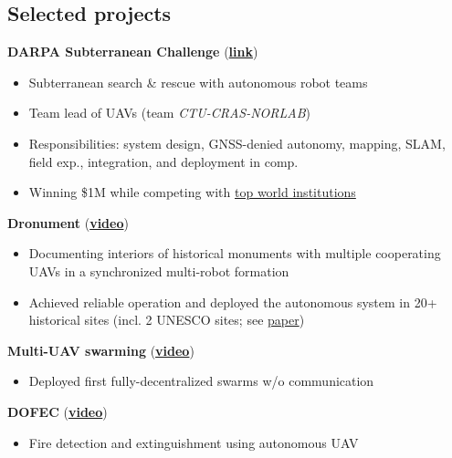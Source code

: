 \documentclass[12pt,a4paper]{article}
\newcommand\Colorhreff[3][reff]{\href{#2}{\color{#1}#3}}
\newcommand{\bluesquare}{\raisebox{0.5ex}{\textcolor{primary}{\rule{0.5ex}{0.5ex}}}}
\newcommand{\parskipheader}{-0.0cm}
\newcommand{\parskipsmall}{0.02cm}
\begin{document}
\begin{paracol}{2}
\vspace{\parskipheader}
\section*{Selected projects}

\noindent
\textbf{DARPA Subterranean Challenge} (\Colorhreff{http://mrs.fel.cvut.cz/projects/darpa}{\textbf{link}})
\begin{itemize}[label=\bluesquare, left=0.5em]
  \item Subterranean search \& rescue with autonomous robot teams
  \item Team lead of UAVs (team \textit{CTU-CRAS-NORLAB})
  \item Responsibilities: system design, GNSS-denied autonomy, mapping, SLAM, field exp., integration, and deployment in comp.
  \item Winning \$1M while competing with \Colorhreff{https://spectrum.ieee.org/darpa-subterranean-challenge}{top world institutions} 
\end{itemize}

\vspace{\parskipsmall}
\noindent
\textbf{Dronument} (\Colorhreff{https://www.youtube.com/watch?v=Gx-mBklSbYc}{\textbf{video}})
\begin{itemize}[label=\bluesquare, left=0.5em]
    \item Documenting interiors of historical monuments with multiple cooperating UAVs in a synchronized multi-robot formation
    \item Achieved reliable operation and deployed the autonomous system in 20+ historical sites (incl. 2 UNESCO sites; see \Colorhreff{https://mrs.fel.cvut.cz/data/papers/petracek2023ram.pdf}{paper})
\end{itemize}

\vspace{\parskipsmall}
\noindent
\textbf{Multi-UAV swarming} (\Colorhreff{https://www.youtube.com/watch?v=Ax3ONfo1hMA}{\textbf{video}})
\begin{itemize}[label=\bluesquare, left=0.5em]
    \item Deployed first fully-decentralized swarms w/o communication
\end{itemize}

\vspace{\parskipsmall}
\noindent
\textbf{DOFEC} (\Colorhreff{https://www.youtube.com/watch?v=QHpifXJzH5g}{\textbf{video}})
\begin{itemize}[label=\bluesquare, left=0.5em]
    \item Fire detection and extinguishment using autonomous UAV
\end{itemize}


\end{paracol}
\end{document}
